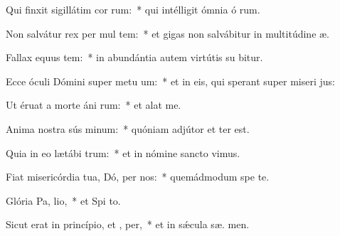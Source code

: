 \item Qui finxit sigillátim cor rum:~* qui intélligit ómnia ó rum.
\item Non salvátur rex per mul tem:~* et gigas non salvábitur in multitúdine  æ.
\item Fallax equus  tem:~* in abundántia autem virtútis su  bitur.
\item Ecce óculi Dómini super metu um:~* et in eis, qui sperant super miseri jus:
\item Ut éruat a morte áni rum:~* et alat   me.
\item Anima nostra sús minum:~* quóniam adjútor et  ter est.
\item Quia in eo lætábi  trum:~* et in nómine sancto  vimus.
\item Fiat misericórdia tua, Dó, per nos:~* quemádmodum spe  te.
\item Glória Pa,  lio,~* et Spi to.
\item Sicut erat in princípio, et ,  per,~* et in sǽcula sæ. men.
